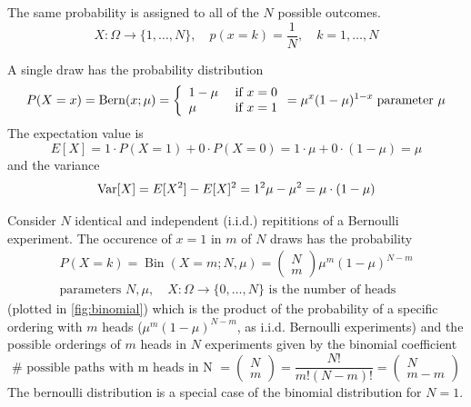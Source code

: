 The same probability is assigned to all of the $N$ possible outcomes.
\begin{equation}
    X: \Omega \rightarrow \{1,\dots,N\}, \quad p(x=k) = \frac{1}{N}, \quad k = 1,\dots,N
\end{equation}

A single draw has the probability distribution
\begin{equation}
    P(X=x)=\operatorname{Bern}(x ; \mu)=\left\{\begin{array}{ll}
    1-\mu & \text { if } x=0 \\
    \mu & \text { if } x=1
    \end{array}=\mu^x(1-\mu)^{1-x}\right. \\
    \text{parameter } \mu
\end{equation}
The expectation value is
\begin{equation}
    E[X] = 1\cdot P(X=1) + 0 \cdot P(X = 0) = 1\cdot \mu + 0\cdot (1-\mu) = \mu
\end{equation}
and the variance
\begin{equation}
    \operatorname{Var}[X] = E[X^2] - E[X]^2 = 1^2 \mu - \mu^2 = \mu \cdot (1-\mu)
\end{equation}

Consider $N$ identical and independent (i.i.d.) repititions of a Bernoulli experiment.
The occurence of $x=1$ in $m$ of $N$ draws has the probability
\begin{equation}
    \begin{gathered}
        P(X=k)=\operatorname{Bin}(X=m ; N, \mu)=\left(\begin{array}{l}
            N \\
            m
            \end{array}\right) \mu^m(1-\mu)^{N-m} \\
            \text{parameters } N, \mu, \quad X: \Omega \rightarrow \{0,\dots,N\} \text{ is the number of heads}
    \end{gathered}
\end{equation}
(plotted in \ref{fig:binomial}) which is the product of the probability of a specific ordering with $m$ heads ($\mu^m(1-\mu)^{N-m}$,
as i.i.d. Bernoulli experiments) and the possible orderings of $m$ heads in $N$ experiments given
by the binomial coefficient
\begin{equation}
    \# \text{ possible paths with m heads in N } = \left( \begin{array}{c} N \\ m \end{array} \right) = \frac{N!}{m!(N-m)!} = \left( \begin{array}{c} N \\ m-m \end{array} \right)
\end{equation}
The bernoulli distribution is a special case of the binomial distribution for $N=1$.

